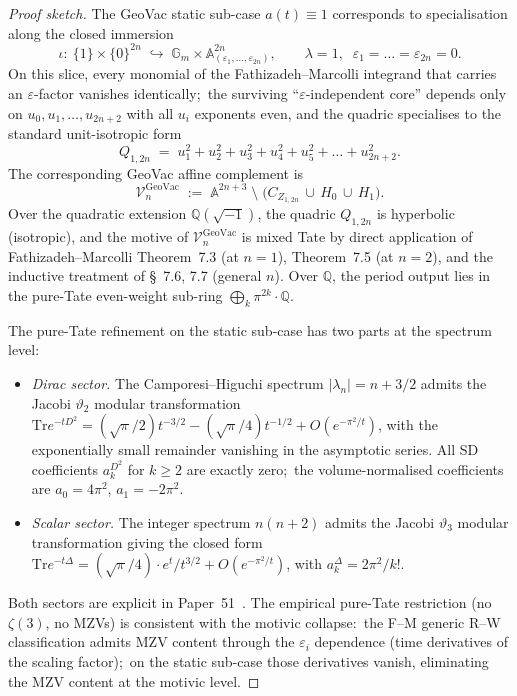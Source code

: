 \documentclass[11pt,a4paper]{article}
\theoremstyle{plain}
\theoremstyle{definition}
\newcommand{\Q}{\mathbb{Q}}
\newcommand{\Tr}{\mathrm{Tr}}
\begin{document}
\begin{proof}[Proof sketch]
The GeoVac static sub-case $a(t) \equiv 1$ corresponds to specialisation
along the closed immersion
\begin{equation}
\label{eq:geovac_specialisation}
\iota:\ \{1\} \times \{0\}^{2n}
\;\hookrightarrow\; \mathbb{G}_m \times \mathbb{A}^{2n}_{(\varepsilon_1, \ldots, \varepsilon_{2n})},
\qquad \lambda = 1,\;\; \varepsilon_1 = \ldots = \varepsilon_{2n} = 0.
\end{equation}
On this slice, every monomial of the Fathizadeh--Marcolli integrand that
carries an $\varepsilon$-factor vanishes identically;\ the surviving
``$\varepsilon$-independent core'' depends only on $u_0, u_1, \ldots, u_{2n+2}$
with all $u_i$ exponents even, and the quadric specialises to the standard
unit-isotropic form
\begin{equation}
\label{eq:geovac_quadric}
Q_{1, 2n} \;=\; u_1^2 + u_2^2 + u_3^2 + u_4^2 + u_5^2 + \ldots + u_{2n+2}^2.
\end{equation}
The corresponding GeoVac affine complement is
\begin{equation}
\label{eq:geovac_complement}
\mathcal{V}_n^{\mathrm{GeoVac}}
\;:=\; \mathbb{A}^{2n+3} \;\setminus\;
\bigl( C_{Z_{1, 2n}} \,\cup\, H_0 \,\cup\, H_1 \bigr).
\end{equation}
Over the quadratic extension $\Q(\sqrt{-1})$, the quadric $Q_{1, 2n}$ is
hyperbolic (isotropic), and the motive of $\mathcal{V}_n^{\mathrm{GeoVac}}$
is mixed Tate by direct application of Fathizadeh--Marcolli Theorem~7.3
(at $n = 1$), Theorem~7.5 (at $n = 2$), and the inductive treatment of
\S~7.6, 7.7 (general $n$).  Over $\Q$, the period output lies in the
pure-Tate even-weight sub-ring $\bigoplus_k \pi^{2k} \cdot \Q$.

The pure-Tate refinement on the static sub-case has two parts at the
spectrum level:
\begin{itemize}
  \item \textit{Dirac sector.}  The Camporesi--Higuchi spectrum
    $|\lambda_n| = n + 3/2$ admits the Jacobi $\vartheta_2$ modular
    transformation
    $\Tr e^{-tD^2} = (\sqrt\pi/2) t^{-3/2} - (\sqrt\pi/4) t^{-1/2}
                    + O(e^{-\pi^2/t})$, with the exponentially small
    remainder vanishing in the asymptotic series.  All SD coefficients
    $a_k^{D^2}$ for $k \ge 2$ are exactly zero;\ the volume-normalised
    coefficients are $a_0 = 4\pi^2$, $a_1 = -2\pi^2$.
  \item \textit{Scalar sector.}  The integer spectrum $n(n+2)$ admits
    the Jacobi $\vartheta_3$ modular transformation giving the closed
    form $\Tr e^{-t\Delta} = (\sqrt\pi/4) \cdot e^t/t^{3/2} +
    O(e^{-\pi^2/t})$, with $a_k^\Delta = 2\pi^2/k!$.
\end{itemize}
Both sectors are explicit in Paper~51~\cite{loutey_paper51}.  The empirical
pure-Tate restriction (no $\zeta(3)$, no MZVs) is consistent with the
motivic collapse:\ the F--M generic R--W classification admits MZV content
through the $\varepsilon_i$ dependence (time derivatives of the scaling
factor);\ on the static sub-case those derivatives vanish, eliminating the
MZV content at the motivic level.


\end{proof}
\end{document}
